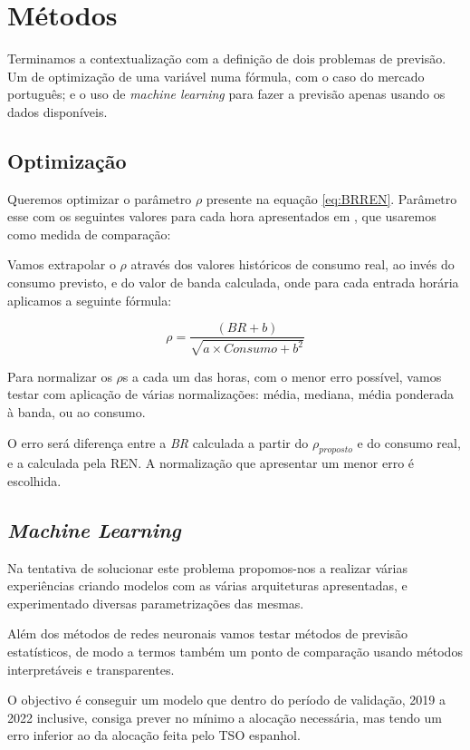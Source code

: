 \section{Métodos}

Terminamos a contextualização com a definição de dois problemas de previsão. Um de optimização de uma variável numa fórmula, com o caso do mercado português; e o uso de \textit{machine learning} para fazer a previsão apenas usando os dados disponíveis.\par

\subsection{Optimização}

Queremos optimizar o parâmetro $\rho$ presente na equação \ref{eq:BRREN}. Parâmetro esse com os seguintes valores para cada hora apresentados em \cite{Carneiro2016}, que usaremos como medida de comparação:\par
\begin{table}[H] \centering \caption{Valores de $\rho$ apresentado em \cite{Carneiro2016}}  \end{table}

Vamos extrapolar o $\rho$ através dos valores históricos de consumo real, ao invés do consumo previsto, e do valor de banda calculada, onde para cada entrada horária aplicamos a seguinte fórmula:\par
\begin{equation} \label{eq:rhoproposed} 
    \rho  = \frac{(BR + b)}{\sqrt{a \times Consumo + b^{2}}}
\end{equation}

Para normalizar os $\rho$s a cada um das horas, com o menor erro possível, vamos testar com aplicação de várias normalizações: média, mediana, média ponderada à banda, ou ao consumo.\par
O erro será diferença entre a \textit{BR} calculada a partir do $\rho_{proposto}$ e do consumo real, e a  calculada pela \gls{REN}. A normalização que apresentar um menor erro é escolhida.\par


\subsection{\textit{Machine Learning}}

Na tentativa de solucionar este problema propomos-nos a realizar várias experiências criando modelos com as várias arquiteturas apresentadas, e experimentado diversas parametrizações das mesmas.\par
Além dos métodos de redes neuronais vamos testar métodos de previsão estatísticos, de modo a termos também um ponto de comparação usando métodos interpretáveis e transparentes.\par
O objectivo é conseguir um modelo que dentro do período de validação, 2019 a 2022 inclusive, consiga prever no mínimo a alocação necessária, mas tendo um erro inferior ao da alocação feita pelo \gls{TSO} espanhol.\par


\thispagestyle{plain}
 \label{se:metstats}


\newpage
\thispagestyle{plain}
 \label{se:metneuralnet}

% 

